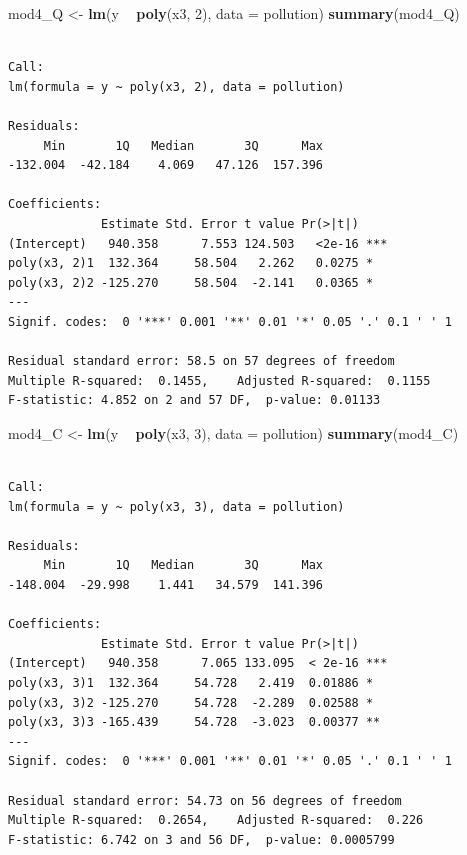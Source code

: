 \documentclass[]{book}
\newenvironment{Shaded}{\begin{snugshade}}{\end{snugshade}}
\newcommand{\KeywordTok}[1]{\textcolor[rgb]{0.13,0.29,0.53}{\textbf{#1}}}
\newcommand{\DataTypeTok}[1]{\textcolor[rgb]{0.13,0.29,0.53}{#1}}
\newcommand{\DecValTok}[1]{\textcolor[rgb]{0.00,0.00,0.81}{#1}}
\newcommand{\StringTok}[1]{\textcolor[rgb]{0.31,0.60,0.02}{#1}}
\newcommand{\OperatorTok}[1]{\textcolor[rgb]{0.81,0.36,0.00}{\textbf{#1}}}
\newcommand{\NormalTok}[1]{#1}
\theoremstyle{definition}
\theoremstyle{definition}
\theoremstyle{definition}
\theoremstyle{remark}
\begin{document}
\begin{Shaded}
\begin{Highlighting}[]
\NormalTok{mod4_Q <-}\StringTok{ }\KeywordTok{lm}\NormalTok{(y }\OperatorTok{~}\StringTok{ }\KeywordTok{poly}\NormalTok{(x3, }\DecValTok{2}\NormalTok{), }\DataTypeTok{data =}\NormalTok{ pollution)}
\KeywordTok{summary}\NormalTok{(mod4_Q)}
\end{Highlighting}
\end{Shaded}

\begin{verbatim}

Call:
lm(formula = y ~ poly(x3, 2), data = pollution)

Residuals:
     Min       1Q   Median       3Q      Max 
-132.004  -42.184    4.069   47.126  157.396 

Coefficients:
             Estimate Std. Error t value Pr(>|t|)    
(Intercept)   940.358      7.553 124.503   <2e-16 ***
poly(x3, 2)1  132.364     58.504   2.262   0.0275 *  
poly(x3, 2)2 -125.270     58.504  -2.141   0.0365 *  
---
Signif. codes:  0 '***' 0.001 '**' 0.01 '*' 0.05 '.' 0.1 ' ' 1

Residual standard error: 58.5 on 57 degrees of freedom
Multiple R-squared:  0.1455,    Adjusted R-squared:  0.1155 
F-statistic: 4.852 on 2 and 57 DF,  p-value: 0.01133
\end{verbatim}

\begin{Shaded}
\begin{Highlighting}[]
\NormalTok{mod4_C <-}\StringTok{ }\KeywordTok{lm}\NormalTok{(y }\OperatorTok{~}\StringTok{ }\KeywordTok{poly}\NormalTok{(x3, }\DecValTok{3}\NormalTok{), }\DataTypeTok{data =}\NormalTok{ pollution)}
\KeywordTok{summary}\NormalTok{(mod4_C)}
\end{Highlighting}
\end{Shaded}

\begin{verbatim}

Call:
lm(formula = y ~ poly(x3, 3), data = pollution)

Residuals:
     Min       1Q   Median       3Q      Max 
-148.004  -29.998    1.441   34.579  141.396 

Coefficients:
             Estimate Std. Error t value Pr(>|t|)    
(Intercept)   940.358      7.065 133.095  < 2e-16 ***
poly(x3, 3)1  132.364     54.728   2.419  0.01886 *  
poly(x3, 3)2 -125.270     54.728  -2.289  0.02588 *  
poly(x3, 3)3 -165.439     54.728  -3.023  0.00377 ** 
---
Signif. codes:  0 '***' 0.001 '**' 0.01 '*' 0.05 '.' 0.1 ' ' 1

Residual standard error: 54.73 on 56 degrees of freedom
Multiple R-squared:  0.2654,    Adjusted R-squared:  0.226 
F-statistic: 6.742 on 3 and 56 DF,  p-value: 0.0005799
\end{verbatim}
\end{document}
